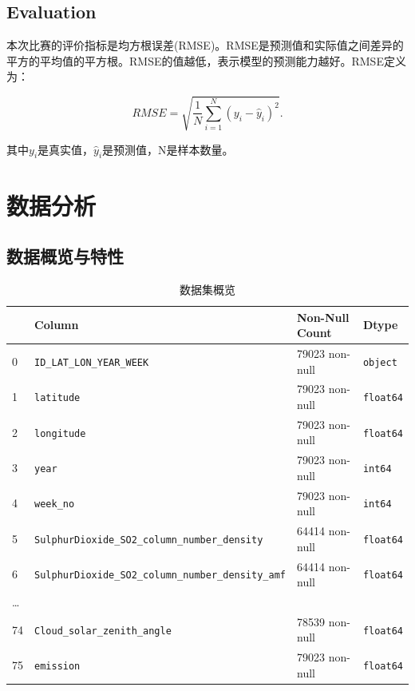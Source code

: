 \documentclass{ctexart}
\begin{document}
\subsection{Evaluation}

本次比赛的评价指标是均方根误差(RMSE)。RMSE是预测值和实际值之间差异的平方的平均值的平方根。RMSE的值越低，表示模型的预测能力越好。RMSE定义为：

\[
    RMSE=\sqrt{\frac{1}{N}\sum\limits_{i=1}^{N}(y_i-\hat y_i)^2}.
\]

其中$y_i$是真实值，$\hat y_i$是预测值，N是样本数量。

\section{数据分析}

\subsection{数据概览与特性}

\begin{table}[h]
      \centering
      \begin{tabular}{l|l|l|l}
      \hline
          \ & Column & Non-Null Count & Dtype \\ \hline
          0 & \texttt{ID\_LAT\_LON\_YEAR\_WEEK} & 79023 non-null &
          \texttt{object} \\
          1 & \texttt{latitude} & 79023 non-null & \texttt{float64} \\
          2 & \texttt{longitude} & 79023 non-null & \texttt{float64} \\
          3 & \texttt{year} & 79023 non-null & \texttt{int64} \\
          4 & \texttt{week\_no} & 79023 non-null & \texttt{int64} \\
          5 & \texttt{SulphurDioxide\_SO2\_column\_number\_density} & 64414
          non-null & \texttt{float64} \\
          6 & \texttt{SulphurDioxide\_SO2\_column\_number\_density\_amf} & 64414
          non-null & \texttt{float64} \\
          \ldots{} & & & \\
          74 & \texttt{Cloud\_solar\_zenith\_angle} & 78539 non-null &
          \texttt{float64} \\
          75 & \texttt{emission} & 79023 non-null & \texttt{float64} \\
          \hline
      \end{tabular}
      \caption{数据集概览}
\end{table}
\end{document}

